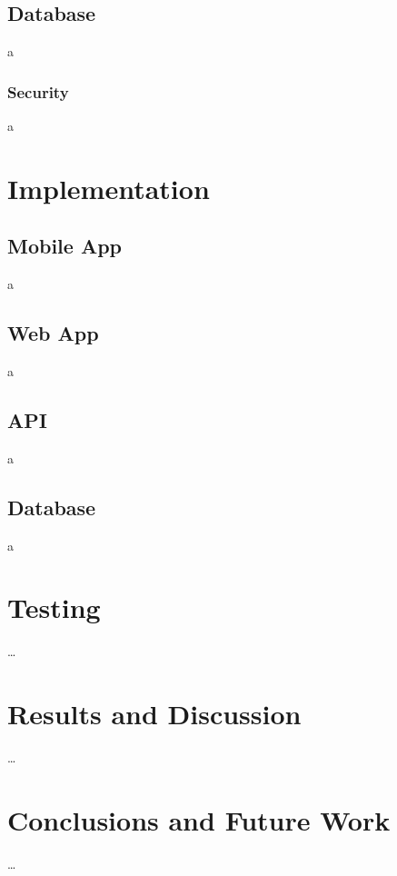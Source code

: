 \documentclass[11pt,openright,a4paper]{report}
\begin{document}
\section{Database} \label{sec:databasedesign}
a

\subsection{Security}
a

\chapter{Implementation}
\section{Mobile App}
a

\section{Web App}
a

\section{API}
a

\section{Database}
a

\chapter{Testing}

\ldots


\chapter{Results and Discussion}

\ldots


\chapter{Conclusions and Future Work}

\ldots

\printbibliography
\end{document}

